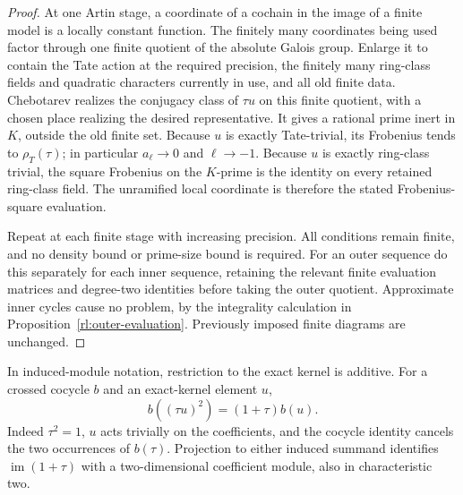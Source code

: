 \begin{proof}
At one Artin stage, a coordinate of a cochain in the image of a
finite model is a locally constant function.  The finitely many
coordinates being used factor through one finite quotient of the
absolute Galois group.  Enlarge it to contain the Tate action at
the required precision, the finitely many ring-class fields and
quadratic characters currently in use, and all old finite data.
Chebotarev realizes the conjugacy class of $\tau u$ on this finite
quotient, with a chosen place realizing the desired representative.
It gives a rational prime inert in $K$, outside the old finite set.
Because $u$ is exactly Tate-trivial, its Frobenius tends to
$\rho_T(\tau)$; in particular $a_\ell\to0$ and $\ell\to-1$.
Because $u$ is exactly ring-class trivial, the square Frobenius on
the $K$-prime is the identity on every retained ring-class field.
The unramified local coordinate is therefore the stated
Frobenius-square evaluation.

Repeat at each finite stage with increasing precision.  All
conditions remain finite, and no density bound or prime-size
bound is required.  For an outer sequence do this separately
for each inner sequence, retaining the relevant finite evaluation
matrices and degree-two identities before taking the outer
quotient.  Approximate inner cycles cause no problem, by the
integrality calculation in Proposition~\ref{rl:outer-evaluation}.
Previously imposed finite diagrams are unchanged.
\end{proof}

In induced-module notation, restriction to the exact kernel is additive.
For a crossed cocycle $b$ and an exact-kernel element $u$,
\[
 b((\tau u)^2)=(1+\tau)b(u).
\]
Indeed $\tau^2=1$, $u$ acts trivially on the coefficients, and the
cocycle identity cancels the two occurrences of $b(\tau)$.  Projection
to either induced summand identifies $\operatorname{im}(1+\tau)$
with a two-dimensional coefficient module, also in characteristic two.

